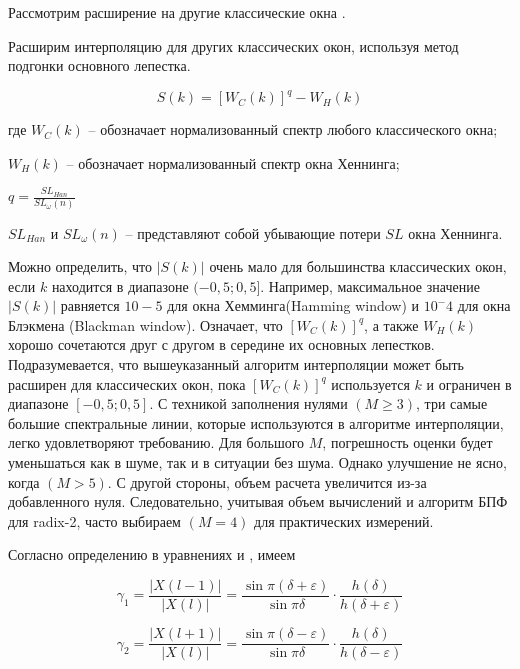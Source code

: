 Рассмотрим расширение на другие классические окна .

Расширим интерполяцию для других классических окон, используя метод подгонки основного лепестка. 

\begin{equation}
	\label{eq:equation60}
	S(k) = [W_C (k)]^q - W_H (k)
\end{equation}

где $W_C (k)$ -- обозначает нормализованный спектр любого классического окна;

$W_H (k)$ -- обозначает нормализованный спектр окна Хеннинга;

$q = \frac{S L_{Han}}{S L_\omega(n)}$

$S L_{Han}$ и $S L_\omega(n)$ -- представляют собой убывающие потери $SL$ окна Хеннинга.

Можно определить, что $|S(k)|$ очень мало 
для большинства классических окон, если $k$ находится в диапазоне  $(-0,5;0,5]$. 
Например, максимальное значение $|S(k)|$ равняется $10-5$ для окна Хемминга(Hamming window) и $10^-4$ для окна Блэкмена (Blackman window).
Означает, что $[W_C (k)]^q$, а также $W_H (k)$ хорошо сочетаются друг с другом в середине их основных лепестков. 
Подразумевается, что вышеуказанный алгоритм интерполяции может быть расширен для классических окон, пока $[W_C (k)]^q$ используется $k$ и ограничен в диапазоне $[-0,5;0,5]$. 
С техникой заполнения нулями $(M\geq3)$, три самые большие спектральные линии, которые используются в алгоритме интерполяции, легко удовлетворяют требованию. Для большого $M$, погрешность оценки будет уменьшаться как в шуме, так и в ситуации без шума. Однако улучшение не ясно, когда $(M>5)$. С другой стороны, объем расчета увеличится из-за добавленного нуля. Следовательно, учитывая объем вычислений и алгоритм БПФ для radix-2, часто выбираем $(M=4)$ для практических измерений.

Согласно определению в уравнениях  и , имеем

\begin{equation}
	\label{eq:equation62}
	\gamma_1 = \frac{\left| X(l-1)\right|}{\left| X(l)\right|} = \frac{\sin \pi({\delta + \varepsilon})}{\sin \pi \delta} \cdot \frac{h(\delta)}{h(\delta + \varepsilon)}
\end{equation}

\begin{equation}
	\label{eq:equation63}
	\gamma_2 = \frac{\left| X(l+1)\right|}{\left| X(l)\right|} = \frac{\sin \pi({\delta - \varepsilon})}{\sin \pi \delta} \cdot \frac{h(\delta)}{h(\delta - \varepsilon)}
\end{equation}

